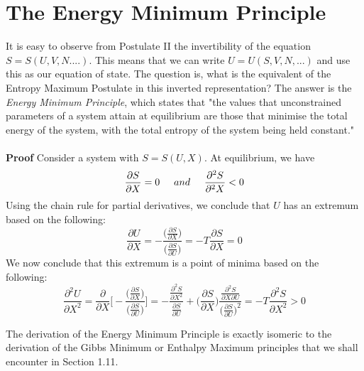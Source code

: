 \documentclass[oneside]{book}
\begin{document}
\section{The Energy Minimum Principle}
It is easy to observe from Postulate II the invertibility of the equation $S = S(U,V,N....)$. This means that we can write $U = U(S,V,N,...)$ and use this as our equation of state. The question is, what is the equivalent of the Entropy Maximum Postulate in this inverted representation? The answer is the \emph{Energy Minimum Principle}, which states that "the values that unconstrained parameters of a system attain at equilibrium are those that minimise the total energy of the system, with the total entropy of the system being held constant." 
\\ 
\\
\textbf{Proof} Consider a system with $S = S(U,X)$. At equilibrium, we have
 \[\frac{\partial S}{\partial X} = 0 \hspace{0.5cm}and \hspace{0.5cm}\frac{\partial ^2 S}{\partial ^2 X} < 0 \] 
 Using the chain rule for partial derivatives, we conclude that $U$ has an extremum based on the following: 
 \[ \frac{\partial U}{\partial X} = - \frac  {\Big(\frac{\partial S}{\partial X }  \Big)} {\Big(\frac{\partial S}{\partial U }         \Big)}  = -T\frac{\partial S}{\partial X} = 0 \]
 We now conclude that this extremum is a point of minima based on the following:
  \[ \frac{\partial ^2 U}{\partial X^2} = \frac{\partial }{\partial X} \Bigg[- \frac  {\Big(\frac{\partial S}{\partial X }  \Big)} {\Big(\frac{\partial S}{\partial U }  \Big) }  \Bigg]  
= -\frac{ \frac{\partial ^2S} { \partial X^2 }    }{  \frac{\partial S}{\partial U}      } + \Big(\frac{\partial S}{\partial X}\Big)\frac{\frac{ \partial^2S  }{\partial X \partial U}       }{ \big( \frac{\partial S}{\partial U} \big)^2}
  = -T\frac{\partial ^2S}{\partial X^2} > 0 \]
 
The derivation of the Energy Minimum Principle is exactly isomeric to the derivation of the Gibbs Minimum or Enthalpy Maximum principles that we shall encounter in Section 1.11.\\
\end{document}
